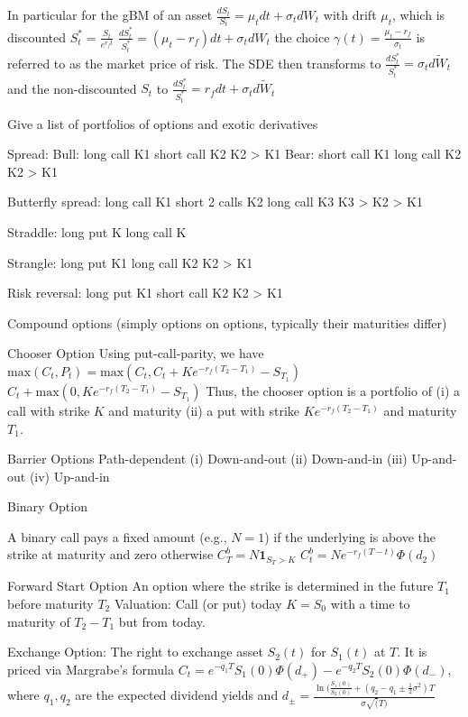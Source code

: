 In particular for the gBM of an asset \( \frac{dS_t}{S_t} = \mu_t dt + \sigma_t dW_t \) with drift \( \mu_t \), which is discounted \( S^{\ast}_t = \frac{S_t}{e^{r_f t}} \)
\( \frac{dS^{\ast}_t}{S^{\ast}_t} = (\mu_t - r_f) dt + \sigma_t dW_t \)
the choice \( \gamma(t) = \frac{\mu_t - r_f}{\sigma_t} \) is referred to as the market price of risk.
The SDE then transforms to
\( \frac{dS^{\ast}_t}{S^{\ast}_t} = \sigma_t d\tilde{W}_t \)
and the non-discounted \( S_t \) to
\( \frac{dS^{\ast}_t}{S^{\ast}_t} = r_f dt + \sigma_t d\tilde{W}_t \)


Give a list of portfolios of options and exotic derivatives

Spread:
Bull:
long call K1
short call K2
K2 > K1
Bear:
short call K1
long call K2
K2 > K1

Butterfly spread:
long call K1
short 2 calls K2
long call K3
K3 > K2 > K1

Straddle:
long put K
long call K


Strangle:
long put K1
long call K2
K2 > K1

Risk reversal:
long put K1
short call K2
K2 > K1

Compound options (simply options on options, typically their maturities differ)

Chooser Option
Using put-call-parity, we have
\( \text{max}(C_t, P_t) = \text{max}(C_t, C_t + Ke^{-r_f(T_2 - T_1)} - S_{T_1}) \)
\( C_t + \text{max}(0, Ke^{-r_f(T_2 - T_1)} - S_{T_1})  \)
Thus, the chooser option is a portfolio of
(i) a call with strike \( K \) and maturity  
(ii) a put with strike \( Ke^{-r_f(T_2 - T_1)} \) and maturity \( T_1 \).

Barrier Options
Path-dependent
(i) Down-and-out
(ii) Down-and-in
(iii) Up-and-out
(iv) Up-and-in

Binary Option

A binary call pays a fixed amount (e.g., \( N = 1 \)) if the underlying is above the strike at
maturity and zero otherwise
\( C_T^b = N\mathbf{1}_{S_T > K} \)
\( C_t^b = Ne^{-r_f(T - t)}\Phi(d_2) \)

Forward Start Option
An option where the strike is determined in the future \( T_1 \) before maturity \( T_2 \)
Valuation:
Call (or put) today \( K = S_0 \) with a time to maturity of \( T_2 - T_1 \) but from today.

Exchange Option:
The right to exchange asset \( S_2(t) \) for \( S_1(t) \) at \( T \). It is priced via Margrabe's formula
\( C_t = e^{-q_1 T}S_1(0)\Phi(d_{+}) - e^{-q_2 T}S_2(0)\Phi(d_{-}) \),
where \( q_1, q_2 \) are the expected dividend yields and
\( d_{\pm} = \frac{\ln(\frac{S_1(0)}{S_2(0)} + (q_2 - q_1 \pm \frac{1}{2} \sigma^2)T}{\sigma \sqrt(T)} \)


